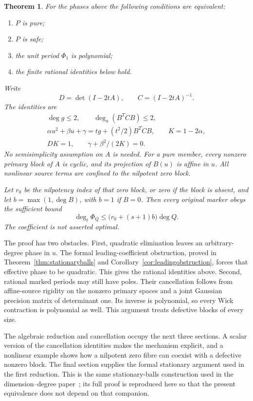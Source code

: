 \documentclass[11pt]{article}
\newtheorem{theorem}{Theorem}[section]
\theoremstyle{definition}\newtheorem{definition}[theorem]{Definition}
\theoremstyle{remark}\newtheorem{remark}[theorem]{Remark}
\begin{document}
\begin{theorem}\label{thm:fullfibre}
For the phases above the following conditions are equivalent:
\begin{enumerate}\setlength{\itemsep}{0pt}
\item $P$ is pure;
\item $P$ is safe;
\item the unit period $\Phi_1$ is polynomial;
\item the finite rational identities below hold.
\end{enumerate}
Write
\[
 D=\det(I-2tA),\qquad C=(I-2tA)^{-1}.
\]
The identities are
\begin{gather}
 \deg g\le2,\qquad \deg_u(B^TCB)\le2,\label{eq:degrees}\\
 \alpha u^2+\beta u+\gamma=tg+(t^2/2)B^TCB,
 \qquad K=1-2\alpha,\label{eq:coefficients}\\
 DK=1,\qquad \gamma+\beta^2/(2K)=0.\label{eq:purity}
\end{gather}
No semisimplicity assumption on $A$ is needed. For a pure member,
every nonzero primary block of $A$ is cyclic, and its projection
of $B(u)$ is affine in $u$. All nonlinear source terms are
confined to the nilpotent zero block.

Let $r_0$ be the nilpotency index of that zero block, or zero if
the block is absent, and let $b=\max(1,\deg B)$, with $b=1$ if
$B=0$. Then every original marker obeys the sufficient bound
\begin{equation}\label{eq:cutoff}
 \deg_t\Phi_Q\le\bigl(r_0+(s+1)b\bigr)\deg Q.
\end{equation}
The coefficient is not asserted optimal.
\end{theorem}

The proof has two obstacles. First, quadratic elimination leaves an
arbitrary-degree phase in $u$. The formal leading-coefficient obstruction,
proved in Theorem~\ref{thm:stationaryballs} and
Corollary~\ref{cor:leadingobstruction}, forces that effective phase to be quadratic.
This gives the rational identities above. Second, rational marked periods
may still have poles. Their cancellation follows from affine-source
rigidity on the nonzero primary spaces and a joint Gaussian precision
matrix of determinant one. Its inverse is polynomial, so every Wick
contraction is polynomial as well. This argument treats defective blocks
of every size.

The algebraic reduction and cancellation occupy the next three sections.
A scalar version of the cancellation identities makes the mechanism
explicit, and a nonlinear example shows how a nilpotent zero fibre can
coexist with a defective nonzero block. The final section supplies the
formal stationary argument used in the first reduction. This is the same
stationary-balls construction used in the dimension--degree
paper~\cite{Boundary}; its full proof is reproduced here so that the
present equivalence does not depend on that companion.
\end{document}

